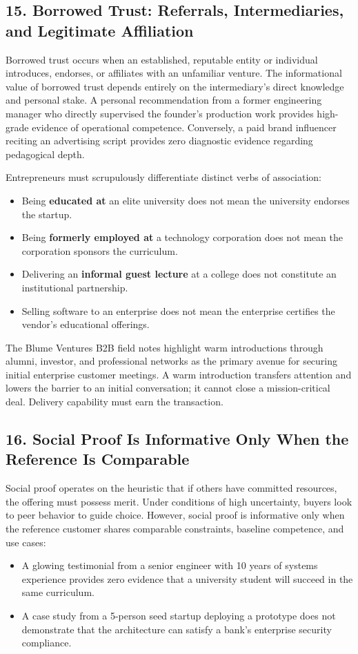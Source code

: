 \subsection*{15. Borrowed Trust: Referrals, Intermediaries, and Legitimate Affiliation}

Borrowed trust occurs when an established, reputable entity or individual introduces, endorses, or affiliates with an unfamiliar venture. The informational value of borrowed trust depends entirely on the intermediary's direct knowledge and personal stake. A personal recommendation from a former engineering manager who directly supervised the founder's production work provides high-grade evidence of operational competence. Conversely, a paid brand influencer reciting an advertising script provides zero diagnostic evidence regarding pedagogical depth.

Entrepreneurs must scrupulously differentiate distinct verbs of association:
\begin{itemize}
\item Being \textbf{educated at} an elite university does not mean the university endorses the startup.
\item Being \textbf{formerly employed at} a technology corporation does not mean the corporation sponsors the curriculum.
\item Delivering an \textbf{informal guest lecture} at a college does not constitute an institutional partnership.
\item Selling software to an enterprise does not mean the enterprise certifies the vendor's educational offerings.
\end{itemize}

The Blume Ventures B2B field notes highlight warm introductions through alumni, investor, and professional networks as the primary avenue for securing initial enterprise customer meetings. A warm introduction transfers attention and lowers the barrier to an initial conversation; it cannot close a mission-critical deal. Delivery capability must earn the transaction.

\subsection*{16. Social Proof Is Informative Only When the Reference Is Comparable}

Social proof operates on the heuristic that if others have committed resources, the offering must possess merit. Under conditions of high uncertainty, buyers look to peer behavior to guide choice. However, social proof is informative only when the reference customer shares comparable constraints, baseline competence, and use cases:
\begin{itemize}
\item A glowing testimonial from a senior engineer with 10 years of systems experience provides zero evidence that a university student will succeed in the same curriculum.
\item A case study from a 5-person seed startup deploying a prototype does not demonstrate that the architecture can satisfy a bank's enterprise security compliance.
\end{itemize}

